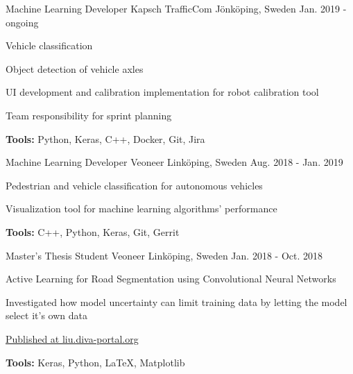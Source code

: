 

\begin{cventries}

  \cventry
    {Machine Learning Developer} %
    {Kapsch TrafficCom} %
    {Jönköping, Sweden} %
    {Jan. 2019 - ongoing} %
    {
      \begin{cvitems} %
        \item {Vehicle classification}
        \item {Object detection of vehicle axles}
        \item {UI development and calibration implementation for robot calibration tool}
        \item {Team responsibility for sprint planning}
        \item {\textbf{Tools:} Python, Keras, C++, Docker, Git, Jira}
      \end{cvitems}
    }

  \cventry
    {Machine Learning Developer} %
    {Veoneer} %
    {Linköping, Sweden} %
    {Aug. 2018 - Jan. 2019} %
    {
      \begin{cvitems} %
        \item {Pedestrian and vehicle classification for autonomous vehicles}
        \item {Visualization tool for machine learning algorithms' performance}
        \item {\textbf{Tools:} C++, Python, Keras, Git, Gerrit}
      \end{cvitems}
    }

  \cventry
    {Master's Thesis Student} %
    {Veoneer} %
    {Linköping, Sweden} %
    {Jan. 2018 - Oct. 2018} %
    {
      \begin{cvitems} %
        \item {Active Learning for Road Segmentation using Convolutional Neural Networks}
        \item {Investigated how model uncertainty can limit training data by letting the model select it's own data}
        \item {\href{https://liu.diva-portal.org/smash/get/diva2:1259079/FULLTEXT01.pdf}{Published at liu.diva-portal.org}}
        \item {\textbf{Tools:} Keras, Python, LaTeX, Matplotlib}
      \end{cvitems}
    }


\end{cventries}
